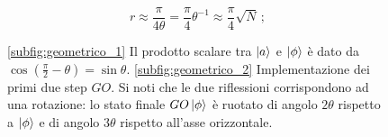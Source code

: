 \begin{equation*}
    r\approx \frac{\pi}{4\theta}=\frac \pi 4 \theta^{-1}\approx \frac \pi 4 \sqrt N \, ;
\end{equation*}
\begin{figure}[!b]
	\centering	
	 \quad
	\caption{\eqref{subfig:geometrico_1} Il prodotto scalare tra $\ket{a}$ e $\ket{\phi}$ è dato da $\cos \! \left( \frac{\pi}{2} - \theta \right) = \sin \theta$. \eqref{subfig:geometrico_2} Implementazione dei primi due step $GO$. Si noti che le due riflessioni corrispondono ad una rotazione: lo stato finale $GO \ket{\phi}$ è ruotato di angolo $2\theta$ rispetto a $\ket{\phi}$ e di angolo $3\theta$ rispetto all'asse orizzontale.}
\label{fig:geometrico}
\end{figure}
